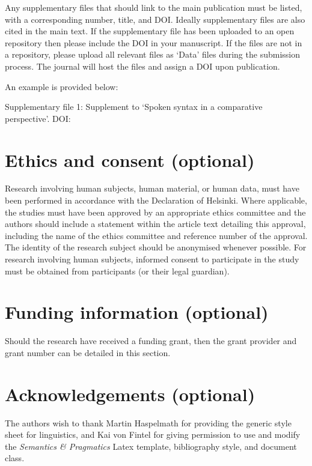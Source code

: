 \documentclass[charis,linguex]{glossa}
\begin{document}
Any supplementary files that should link to the main publication must be listed, with a corresponding number, title, and DOI. Ideally supplementary files are also cited in the main text. If the supplementary file has been uploaded to an open repository then please include the DOI in your manuscript. If the files are not in a repository, please upload all relevant files as `Data' files during the submission process. The journal will host the files and assign a DOI upon publication. 

An example is provided below:

\noindent Supplementary file 1: Supplement to ‘Spoken syntax in a comparative perspective’. DOI: 

\section*{Ethics and consent (optional)}

Research involving human subjects, human material, or human data, must have been performed in accordance with the Declaration of Helsinki. Where applicable, the studies must have been approved by an appropriate ethics committee and the authors should include a statement within the article text detailing this approval, including the name of the ethics committee and reference number of the approval. The identity of the research subject should be anonymised whenever possible. For research involving human subjects, informed consent to participate in the study must be obtained from participants (or their legal guardian).


\section*{Funding information (optional)}

Should the research have received a funding grant, then the grant provider and grant number can be detailed in this section. 

\section*{Acknowledgements (optional)}

The authors wish to thank Martin Haspelmath for providing the generic style sheet for linguistics, and Kai von Fintel for giving permission to use and modify the \textit{Semantics \& Pragmatics} Latex template, bibliography style, and document class.
\end{document}
